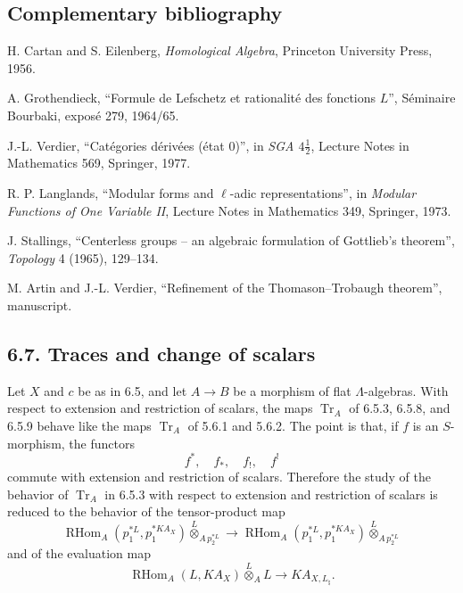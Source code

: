 \documentclass[11pt]{article}
\theoremstyle{plain}
\theoremstyle{definition}
\theoremstyle{remark}
\DeclareMathOperator{\Tr}{Tr}
\DeclareMathOperator{\RHom}{RHom}
\begin{document}
\subsection*{Complementary bibliography}

\begin{enumerate}[label={[\arabic*]}]
\item H. Cartan and S. Eilenberg, \emph{Homological Algebra}, Princeton University Press, 1956.
\item A. Grothendieck, ``Formule de Lefschetz et rationalité des fonctions $L$'', Séminaire Bourbaki, exposé 279, 1964/65.
\item J.-L. Verdier, ``Catégories dérivées (état 0)'', in \emph{SGA $4\frac12$}, Lecture Notes in Mathematics 569, Springer, 1977.
\item R. P. Langlands, ``Modular forms and $\ell$-adic representations'', in \emph{Modular Functions of One Variable II}, Lecture Notes in Mathematics 349, Springer, 1973.
\item J. Stallings, ``Centerless groups -- an algebraic formulation of Gottlieb's theorem'', \emph{Topology} 4 (1965), 129--134.
\item M. Artin and J.-L. Verdier, ``Refinement of the Thomason--Trobaugh theorem'', manuscript.
\end{enumerate}

\newpage

\subsection*{6.7. Traces and change of scalars}

Let $X$ and $c$ be as in 6.5, and let $A\to B$ be a morphism of flat
$\Lambda$-algebras. With respect to extension and restriction of scalars, the maps
$\Tr_A$ of 6.5.3, 6.5.8, and 6.5.9 behave like the maps $\Tr_A$ of 5.6.1 and
5.6.2. The point is that, if $f$ is an $S$-morphism, the functors
\[
       f^*,\quad f_*,\quad f_!,\quad f^!
\]
commute with extension and restriction of scalars. Therefore the study of the
behavior of $\Tr_A$ in 6.5.3 with respect to extension and restriction of scalars is
reduced to the behavior of the tensor-product map
\[
\RHom_A(p_1^{*L},p_1^{*K A_X})\overset{L}{\otimes}_{A\,p_2^{*L}}
\longrightarrow
\RHom_A(p_1^{*L},p_1^{*K A_X})\overset{L}{\otimes}_{A\,p_2^{*L}}
\]
and of the evaluation map
\[
\RHom_A(L,K A_X)\overset{L}{\otimes}_A L\longrightarrow K A_{X,L_\natural}.
\]
\end{document}
